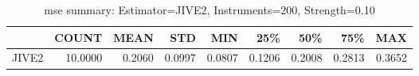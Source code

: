 \begin{table}[ht]
\centering
\caption{mse summary: Estimator=JIVE2, Instruments=200, Strength=0.10}
\begin{tabular}{lrrrrrrrr}
\toprule
 & COUNT & MEAN & STD & MIN & 25\% & 50\% & 75\% & MAX \\
\midrule
JIVE2 & 10.0000 & 0.2060 & 0.0997 & 0.0807 & 0.1206 & 0.2008 & 0.2813 & 0.3652 \\
\bottomrule
\end{tabular}
\end{table}

